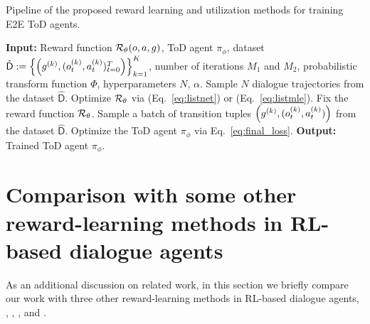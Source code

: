 \begin{algorithm}[H]
\captionsetup{font=small}
\caption{Pipeline of the proposed reward learning and utilization methods for training E2E ToD agents.}
\label{algo:main}
\begin{algorithmic}
\STATE \textbf{Input:} Reward function ${\mathcal{R}}_{\theta}(o, a, g)$, ToD agent $\pi_{\phi}$, dataset $\hat{\mathsf{D}} := \left\{\left(g^{(k)}, (o_t^{(k)}, a_{t}^{(k)})_{t=0}^{T}\right) \right\}_{k=1}^{K}$, number of iterations $M_{1}$ and $M_{2}$, probabilistic transform function $\Phi$, hyperparameters $N$, $\alpha$.
\STATE
{}
\STATE Sample $N$ dialogue trajectories from the dataset $\hat{\mathsf{D}}$.
\STATE Optimize ${\mathcal{R}}_{\theta}$ via \rewardnet (Eq.~\eqref{eq:listnet}) or \rewardmle (Eq.~\eqref{eq:listmle}).
\ENDFOR
\STATE Fix the reward function ${\mathcal{R}}_{\theta}$.
\STATE Sample a batch of transition tuples $\left(g^{(k)}, (o_t^{(k)}, a_{t}^{(k)})\right)$ from the dataset $\hat{\mathsf{D}}$.
\STATE Optimize the ToD agent $\pi_{\phi}$ via Eq.~\eqref{eq:final_loss}.
\ENDFOR
\STATE
\STATE \textbf{Output:} Trained ToD agent $\pi_{\phi}$. 

\end{algorithmic}
\end{algorithm}


\clearpage


\section{Comparison with some other reward-learning methods in RL-based dialogue agents} \label{sec:add_related_work}
As an additional discussion on related work, in this section we briefly compare our work with three other reward-learning methods in RL-based dialogue agents, \ie, \citet{saito2018curriculum}, \citet{hu2018playing}, and \citet{li2020guided}.



